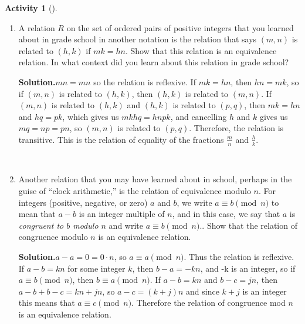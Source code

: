 \documentclass[10pt,]{book}
\theoremstyle{plain}
\theoremstyle{definition}
\newtheorem{activity}[project]{Activity}
\numberwithin{equation}{chapter}
\begin{document}
\begin{activity}[]
\begin{enumerate}[label=(\alph*)]
~\par
\item A relation \(R\) on the set of ordered pairs of positive integers that you learned about in grade school in another notation is the relation that says \((m,n)\) is related to \((h,k)\) if \(mk =hn\). Show that this relation is an equivalence relation. In what context did you learn about this relation in grade school?%
\par\medskip\noindent%
\textbf{Solution.}\quad \(mn=mn\) so the relation is reflexive. If \(mk=hn\), then \(hn=mk\), so if \((m,n)\) is related to \((h,k)\), then \((h,k)\) is related to \((m,n)\). If \((m,n)\) is related to \((h,k)\) and \((h,k)\) is related to \((p,q)\), then \(mk=hn\) and \(hq=pk\), which gives us \(mkhq=hnpk\), and cancelling \(h\) and \(k\) gives us \(mq=np=pn\), so \((m,n)\) is related to \((p,q)\). Therefore, the relation is transitive. This is the relation of equality of the fractions \(\frac{m}{n}\) and \(\frac{h}{k}\).%

~\par
\item Another relation that you may have learned about in school, perhaps in the guise of ``clock arithmetic,'' is the relation of equivalence modulo \(n\). For integers (positive, negative, or zero) \(a\) and \(b\), we write \(a
\equiv b \pmod{n}\) to mean that \(a-b\) is an integer multiple of \(n\), and in this case, we say that \(a\) is \emph{congruent to \(b\) modulo \(n\)} and write \(a\equiv b \pmod{n}\).. Show that the relation of congruence modulo \(n\) is an equivalence relation.%
\par\medskip\noindent%
\textbf{Solution.}\quad \(a-a=0=0\cdot n\), so \(a\equiv a\pmod{n}\). Thus the relation is reflexive. If \(a-b=kn\) for some integer \(k\), then \(b-a=-kn\), and -k is an integer, so if \(a\equiv b \pmod{n}\), then \(b\equiv a \pmod{n}\). If \(a-b=kn\) and \(b-c= jn\), then \(a-b+b-c=kn+jn\), so \(a-c=(k+j)n\) and since \(k+j\) is an integer this means that \(a\equiv c\pmod{n}\). Therefore the relation of congruence mod \(n\) is an equivalence relation.%


\end{enumerate}
\end{activity}
\end{document}
